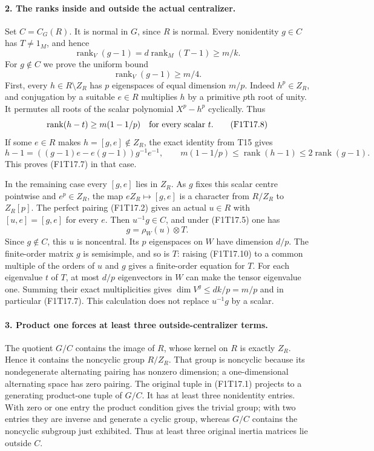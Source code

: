 \paragraph{2. The ranks inside and outside the actual centralizer.}
Set $C=C_G(R)$. It is normal in $G$, since $R$ is normal.
Every nonidentity $g\in C$ has $T\ne1_M$, and hence
\[
           \operatorname{rank}_V(g-1)
               =d\operatorname{rank}_M(T-1)\ge m/k.
 \tag{F1T17.6}
\]
For $g\notin C$ we prove the uniform bound
\[
                         \operatorname{rank}_V(g-1)\ge m/4.
 \tag{F1T17.7}
\]
First, every $h\in R\setminus Z_R$ has $p$ eigenspaces
of equal dimension $m/p$. Indeed $h^p\in Z_R$, and
conjugation by a suitable $e\in R$ multiplies $h$ by
a primitive $p$th root of unity. It permutes all roots
of the scalar polynomial $X^p-h^p$ cyclically. Thus
\[
          \operatorname{rank}(h-t)\ge m(1-1/p)
                     \quad\hbox{for every scalar }t.
 \tag{F1T17.8}
\]
If some $e\in R$ makes $h=[g,e]\notin Z_R$, the exact
identity from T15 gives
\[
 h-1=((g-1)e-e(g-1))g^{-1}e^{-1},\qquad
 m(1-1/p)\le\operatorname{rank}(h-1)
                        \le2\operatorname{rank}(g-1).
 \tag{F1T17.9}
\]
This proves (F1T17.7) in that case.

In the remaining case every $[g,e]$ lies in $Z_R$.
As $g$ fixes this scalar centre pointwise and $e^p\in Z_R$,
the map $eZ_R\mapsto[g,e]$ is a character from $R/Z_R$
to $Z_R[p]$. The perfect pairing (F1T17.2) gives an
actual $u\in R$ with $[u,e]=[g,e]$ for every $e$.
Then $u^{-1}g\in C$, and under (F1T17.5) one has
\[
                       g=\rho_W(u)\otimes T.
 \tag{F1T17.10}
\]
Since $g\notin C$, this $u$ is noncentral. Its $p$
eigenspaces on $W$ have dimension $d/p$. The finite-order
matrix $g$ is semisimple, and so is $T$: raising (F1T17.10)
to a common multiple of the orders of $u$ and $g$ gives
a finite-order equation for $T$. For each eigenvalue $t$
of $T$, at most $d/p$ eigenvectors in $W$ can make the
tensor eigenvalue one. Summing their exact multiplicities
gives $\dim V^g\le dk/p=m/p$ and in particular (F1T17.7).
This calculation does not replace $u^{-1}g$ by a scalar.

\paragraph{3. Product one forces at least three outside-centralizer terms.}
The quotient $G/C$ contains the image of $R$, whose kernel
on $R$ is exactly $Z_R$. Hence it contains the noncyclic
group $R/Z_R$. That group is noncyclic because its
nondegenerate alternating pairing has nonzero dimension;
a one-dimensional alternating space has zero pairing.
The original tuple in (F1T17.1) projects to a generating
product-one tuple of $G/C$. It has at least three
nonidentity entries. With zero or one entry the product
condition gives the trivial group; with two entries they
are inverse and generate a cyclic group, whereas $G/C$
contains the noncyclic subgroup just exhibited.
Thus at least three original inertia matrices lie
outside $C$.


